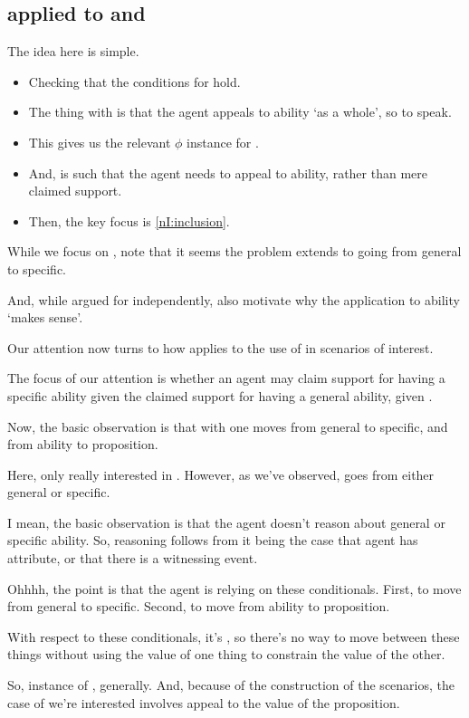 \subsection{\nI{} applied to \gsi{} and \adA{}}
\label{sec:ni-ability:adA}

\begin{note}
  The idea here is simple.
  \begin{itemize}
  \item Checking that the conditions for \nI{} hold.
  \item The thing with \adA{} is that the agent appeals to ability `as a whole', so to speak.
  \item This gives us the relevant \(\phi\) instance for \nI{}.
  \item And,  is such that the agent needs to appeal to ability, rather than mere claimed support.
  \item Then, the key focus is \ref{nI:inclusion}.
  \end{itemize}

  While we focus on , note that it seems the problem extends to going from general to specific.

  And, while argued for \nI{} independently, also motivate why the application to ability `makes sense'.
\end{note}

\begin{note}
  Our attention now turns to how \nI{} applies to the use of  in scenarios of interest.

  The focus of our attention is whether an agent may claim support for having a specific ability given the claimed support for having a general ability, given \gsi{}.
\end{note}

\begin{note}
  Now, the basic observation is that with \adA{} one moves from general to specific, and from ability to proposition.

  Here, only really interested in .
  However, as we've observed, goes from either general or specific.

  I mean, the basic observation is that the agent doesn't reason about general or specific ability.
  So, reasoning follows from it being the case that agent has attribute, or that there is a witnessing event.

  Ohhhh, the point is that the agent is relying on these conditionals.
  First, to move from general to specific.
  Second, to move from ability to proposition.

  With respect to these conditionals, it's \adA{}, so there's no way to move between these things without using the value of one thing to constrain the value of the other.

  So, instance of \adA{}, generally.
  And, because of the construction of the scenarios, the case of \adA{} we're interested involves appeal to the value of the proposition.
\end{note}


